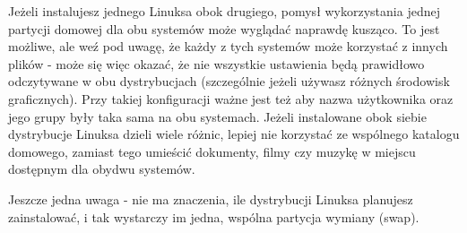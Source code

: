 Jeżeli instalujesz jednego Linuksa obok drugiego, pomysł wykorzystania jednej partycji domowej dla obu systemów może wyglądać naprawdę kusząco. To jest możliwe, ale weź pod uwagę, że każdy z tych systemów może korzystać z innych plików - może się więc okazać, że nie wszystkie ustawienia będą prawidłowo odczytywane w obu dystrybucjach (szczególnie jeżeli używasz różnych środowisk graficznych). Przy takiej konfiguracji ważne jest też aby nazwa użytkownika oraz jego grupy były taka sama na obu systemach. Jeżeli instalowane obok siebie dystrybucje Linuksa dzieli wiele różnic, lepiej nie korzystać ze wspólnego katalogu domowego, zamiast tego umieścić dokumenty, filmy czy muzykę w miejscu dostępnym dla obydwu systemów.

Jeszcze jedna uwaga - nie ma znaczenia, ile dystrybucji Linuksa planujesz zainstalować, i tak wystarczy im jedna, wspólna partycja wymiany (swap).
\clearpage